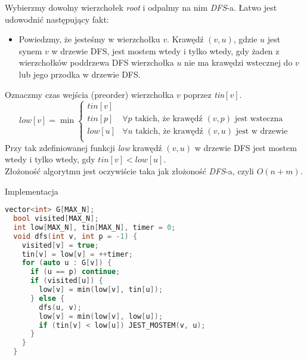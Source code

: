 \documentclass[../main.tex]{subfiles}
\begin{document}
\begin{frame}{\subsecname}

  Wybierzmy dowolny wierzchołek \textit{root} i odpalmy na nim \textit{DFS}-a.
  Łatwo jest udowodnić następujący fakt:

  \begin{itemize}
    \pause\item
      Powiedzmy, że jesteśmy w wierzchołku $v$. Krawędź $(v, u)$, gdzie $u$ jest synem $v$ w
      drzewie DFS, jest mostem wtedy i tylko wtedy, gdy żaden z wierzchołków poddrzewa DFS
      wierzchołka $u$ nie ma krawędzi wstecznej do $v$ lub jego przodka w drzewie DFS.
  \end{itemize}

\end{frame}

\begin{frame}{\subsecname}

  Oznaczmy czas wejścia (preorder) wierzchołka $v$ poprzez \textit{tin}$[v]$.\\
  \pause\[
    \textit{low}[v] = \min
    \begin{cases}
      \textit{tin}[v]\\
      \textit{tin}[p] &\forall\text{$p$ takich, że krawędź $(v,p)$ jest wsteczna}\\
      \textit{low}[u] &\forall\text{$u$ takich, że krawędź $(v,u)$ jest w drzewie}\\
    \end{cases}
  \]\pause
  Przy tak zdefiniowanej funkcji \textit{low} krawędź $(v, u)$ w drzewie DFS jest mostem wtedy
  i tylko wtedy, gdy $\textit{tin}[v] < \textit{low}[u]$.\\

  Złożoność algorytmu jest oczywiście taka jak złożoność \textit{DFS}-a, czyli $O(n + m)$.

\end{frame}

\begin{frame}[fragile]{\subsecname}{Implementacja}

\begin{block}{}
\begin{lstlisting}[language = C++]
  vector<int> G[MAX_N];
  bool visited[MAX_N];
  int low[MAX_N], tin[MAX_N], timer = 0;
  void dfs(int v, int p = -1) {
    visited[v] = true;
    tin[v] = low[v] = ++timer;
    for (auto u : G[v]) {
      if (u == p) continue;
      if (visited[u]) {
        low[v] = min(low[v], tin[u]);
      } else {
        dfs(u, v);
        low[v] = min(low[v], low[u]);
        if (tin[v] < low[u]) JEST_MOSTEM(v, u);
      }
    }
  }
\end{lstlisting}
\end{block}

\end{frame}
\end{document}
